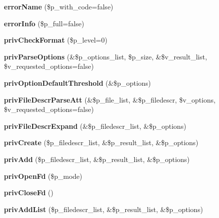 \begin{DoxyCompactItemize}
\item 
{\bfseries error\+Name} (\$p\+\_\+with\+\_\+code=false)\label{class_pcl_zip_a8da68c993683ee7c67b600333580b718}

\item 
{\bfseries error\+Info} (\$p\+\_\+full=false)\label{class_pcl_zip_ab3468e0b3ba9bfcc54aa27f4b62ea52a}

\item 
{\bfseries priv\+Check\+Format} (\$p\+\_\+level=0)\label{class_pcl_zip_a73f73a0ca89cba89a5f38bff918b609a}

\item 
{\bfseries priv\+Parse\+Options} (\&\$p\+\_\+options\+\_\+list, \$p\+\_\+size, \&\$v\+\_\+result\+\_\+list, \$v\+\_\+requested\+\_\+options=false)\label{class_pcl_zip_a6ea996087e129fd4556bf8edb5c96ea6}

\item 
{\bfseries priv\+Option\+Default\+Threshold} (\&\$p\+\_\+options)\label{class_pcl_zip_a1ae8242d93e35959dd5fd586df493865}

\item 
{\bfseries priv\+File\+Descr\+Parse\+Att} (\&\$p\+\_\+file\+\_\+list, \&\$p\+\_\+filedescr, \$v\+\_\+options, \$v\+\_\+requested\+\_\+options=false)\label{class_pcl_zip_a0d421a58c84f0e40c9b93fec0e143903}

\item 
{\bfseries priv\+File\+Descr\+Expand} (\&\$p\+\_\+filedescr\+\_\+list, \&\$p\+\_\+options)\label{class_pcl_zip_a6c21aa203c0af43b20e0619e440e3042}

\item 
{\bfseries priv\+Create} (\$p\+\_\+filedescr\+\_\+list, \&\$p\+\_\+result\+\_\+list, \&\$p\+\_\+options)\label{class_pcl_zip_a232426fe8db24f7c06d6bbf457486091}

\item 
{\bfseries priv\+Add} (\$p\+\_\+filedescr\+\_\+list, \&\$p\+\_\+result\+\_\+list, \&\$p\+\_\+options)\label{class_pcl_zip_a782fc64a3275fb4a840fbcb7bc3993c4}

\item 
{\bfseries priv\+Open\+Fd} (\$p\+\_\+mode)\label{class_pcl_zip_a1c9851530af54963f6b6f7b53074f450}

\item 
{\bfseries priv\+Close\+Fd} ()\label{class_pcl_zip_a683080eec974cf312e0af3bab9f375a7}

\item 
{\bfseries priv\+Add\+List} (\$p\+\_\+filedescr\+\_\+list, \&\$p\+\_\+result\+\_\+list, \&\$p\+\_\+options)\label{class_pcl_zip_acc8255c2cc3437b9f6a3e5d35f0568fe}


\end{DoxyCompactItemize}
